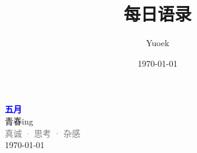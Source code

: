 \documentclass[UTF8, a4paper, 12pt]{ctexart}
\title{\Large 每日语录}
\author{Yuoek}
\date{\today}
\begin{document}
\thispagestyle{empty}
\maketitle
\clearpage

\tableofcontents
\clearpage

\thispagestyle{empty}
\vspace*{\fill}
\begin{center}
    \textcolor{blue}{\Huge\textbf{五月}} \\[1em]
    \textcolor{blue!60!black}{\Large 青春ing} \\[2em]
    \textcolor{gray}{\large 真诚 · 思考 · 杂感} \\[1em]
    \today
\end{center}
\vspace*{\fill}
\clearpage


\clearpage
\end{document}
